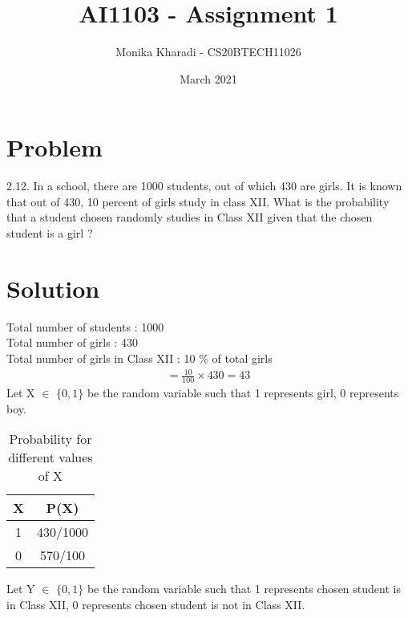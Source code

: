 \documentclass[journal,12pt,two column]{IEEEtran}
\title{AI1103 - Assignment 1}
\author{Monika Kharadi - CS20BTECH11026}
\date{March 2021}
\begin{document}
\maketitle
\section*{\large\textbf{Problem}}

2.12. In a school, there are 1000 students, out of which 430 are girls. It is known that out of 430, 10 percent of girls study in class XII. What is the probability that a student chosen randomly studies in Class XII given that the chosen student is a girl ?
{\section*{\large\textbf{Solution}}}
Total number of students : 1000 \\
Total number of girls : 430  \\
Total number of girls in Class XII : 10 \% of total girls 
\begin{align}
=\frac{10}{100}\times 430 =43
\end{align}
Let X $\in$ $\{0,1\}$ be the random variable such that 1 represents girl, 0 represents boy.

\begin{table}[ht]
\caption{Probability for different values of X}
\begin{center}
\begin{tabular}{|c|c|}
    \hline
    X & P(X) \\
    \hline
    1 & 430/1000\\
    \hline
    0 & 570/100\\
    \hline
    \end{tabular} 
\end{center} \label{table:caption}   
\end{table}

Let Y $\in$ $\{0,1\}$ be the random variable such that 1 represents chosen student is in Class XII, 0 represents chosen student is not in Class XII.
\end{document}
